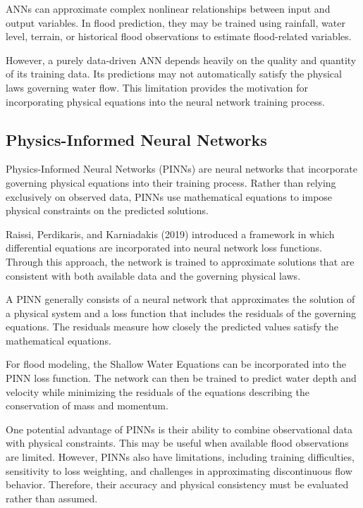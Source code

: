 ANNs can approximate complex nonlinear relationships between input and output variables. In flood prediction, they may be trained using rainfall, water level, terrain, or historical flood observations to estimate flood-related variables.

However, a purely data-driven ANN depends heavily on the quality and quantity of its training data. Its predictions may not automatically satisfy the physical laws governing water flow. This limitation provides the motivation for incorporating physical equations into the neural network training process.

\subsection{Physics-Informed Neural Networks}


Physics-Informed Neural Networks (PINNs) are neural networks that incorporate governing physical equations into their training process. Rather than relying exclusively on observed data, PINNs use mathematical equations to impose physical constraints on the predicted solutions.

Raissi, Perdikaris, and Karniadakis (2019) introduced a framework in which differential equations are incorporated into neural network loss functions. Through this approach, the network is trained to approximate solutions that are consistent with both available data and the governing physical laws.

A PINN generally consists of a neural network that approximates the solution of a physical system and a loss function that includes the residuals of the governing equations. The residuals measure how closely the predicted values satisfy the mathematical equations.

For flood modeling, the Shallow Water Equations can be incorporated into the PINN loss function. The network can then be trained to predict water depth and velocity while minimizing the residuals of the equations describing the conservation of mass and momentum.

One potential advantage of PINNs is their ability to combine observational data with physical constraints. This may be useful when available flood observations are limited. However, PINNs also have limitations, including training difficulties, sensitivity to loss weighting, and challenges in approximating discontinuous flow behavior. Therefore, their accuracy and physical consistency must be evaluated rather than assumed.

